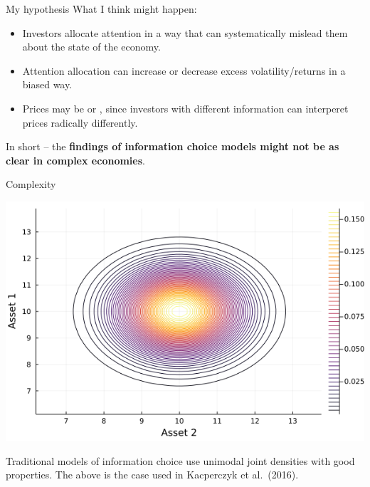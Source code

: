 \documentclass[
  ignorenonframetext,
]{beamer}
\providecommand{\tightlist}{%
  \setlength{\itemsep}{0pt}\setlength{\parskip}{0pt}}
\begin{document}
\begin{frame}{My hypothesis}
\protect\hypertarget{my-hypothesis-1}{}
What I think might happen:

\begin{itemize}
\tightlist
\item
  Investors allocate attention in a way that can systematically mislead
  them about the state of the economy.
\item
  Attention allocation can increase or decrease excess
  volatility/returns in a biased way.
\item
  Prices may be  or ,
  since investors with different information can interperet prices
  radically differently.
\end{itemize}

In short -- the
\textbf{findings of information choice models might not be as clear in complex economies}.
\end{frame}

\begin{frame}{Complexity}
\protect\hypertarget{complexity}{}
\begin{center}\includegraphics[width=0.9\paperheight]{complexity_files/figure-beamer/unnamed-chunk-2-1} \end{center}

Traditional models of information choice use unimodal joint densities
with good properties. The above is the case used in Kacperczyk et
al.~(2016).
\end{frame}
\end{document}
